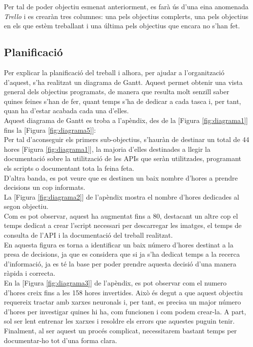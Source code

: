 ﻿\documentclass[10pt,a4paper,twocolumn,twoside]{article}
\begin{document}
Per tal de poder objectiu esmenat anteriorment, es farà ús d'una eina anomenada \textit{Trello}\cite{trello} i es crearàn tres columnes: una pels objectius complerts, una pels objectius en els que estèm treballant i una última pels objectius que encara no s'han fet.

\subsection{Planificació}

Per explicar la planificació del treball i alhora, per ajudar a l'organització d'aquest, s'ha realitzat un diagrama de Gantt.\cite{Gantt}
Aquest permet obtenir una vista general dels objectius programats, de manera que resulta molt senzill saber quines feines s'han de fer, quant temps s'ha de dedicar a cada tasca i, per tant, quan ha d'estar acabada cada una d'elles.\\

Aquest diagrama de Gantt es troba a l'apèndix, des de la [Figura \ref{fig:diagrama1}] fins la [Figura \ref{fig:diagrama5}]:\\


Per tal d'aconseguir els primers sub-objectius, s'hauràn de destinar un total de 44 hores [Figura \ref{fig:diagrama1}], la majoria d'elles destinades a llegir la documentació sobre la utilització de les APIs que seràn utilitzades, programant els scripts o documentant tota la feina feta.\\
D'altra banda, es pot veure que es destinen un baix nombre d'hores a prendre decisions un cop informats.\\


La [Figura \ref{fig:diagrama2}] de l'apèndix mostra el nombre d'hores dedicades al segon objectiu.\\
Com es pot observar, aquest ha augmentat fins a 80, destacant un altre cop el temps dedicat a crear l'script necessari per descarregar les imatges, el temps de consulta de l'API i la documentació del treball realitzat.\\
En aquesta figura es torna a identificar un baix número d'hores destinat a la presa de decisions, ja que es considera que si ja s'ha dedicat temps a la recerca d'informació, ja es té la base per poder prendre aquesta decisió d'una manera ràpida i correcta.\\


En la [Figura \ref{fig:diagrama3}] de l'apèndix, es pot observar com el numero d'hores creix fins a les 158 hores invertides. Això és degut a que aquest objectiu requereix tractar amb xarxes neuronals i, per tant, es precisa un major número d'hores per investigar quines hi ha, com funcionen i com podem crear-la.
A part, sol ser lent entrenar les xarxes i resoldre els errors que aquestes puguin tenir.
Finalment, al ser aquest un procés complicat, necessitarem bastant temps per documentar-ho tot d'una forma clara.\\
\end{document}
